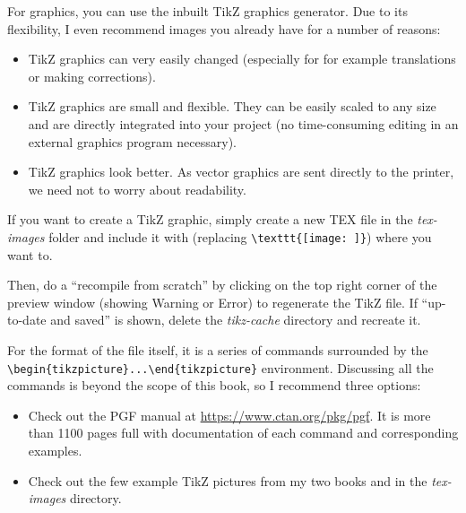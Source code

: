 For graphics, you can use the inbuilt TikZ graphics generator. Due to its
flexibility, I even recommend images you already have for a number of reasons:

\begin{itemize}
    \item TikZ graphics can very easily changed (especially for for example
    translations or making corrections).
    \item TikZ graphics are small and flexible. They can be easily scaled to any
    size and are directly integrated into your project (no time-consuming
    editing in an external graphics program necessary).
    \item TikZ graphics look better. As vector graphics are sent directly to the
    printer, we need not to worry about readability.
\end{itemize}

If you want to create a TikZ graphic, simply create a new TEX file in the
\textit{tex-images} folder and include it with \lstinline[language=Tex]!!
(replacing \lstinline[language=Tex]!\texttt{[image: ]}!) where you want to. 

Then, do a ``recompile from scratch'' by clicking on the top right corner of the
preview window (showing Warning or Error) to regenerate the TikZ file. If
``up-to-date and saved'' is shown, delete the \textit{tikz-cache} directory and
recreate it. 

For the format of the file itself, it is a series of commands surrounded by the
\lstinline[language=Tex]!\begin{tikzpicture}...\end{tikzpicture}! environment.
Discussing all the commands is beyond the scope of this book, so I recommend
three options:

\begin{itemize}
    \item Check out the PGF manual at \url{https://www.ctan.org/pkg/pgf}. It is
    more than 1100 pages full with documentation of each command and
    corresponding examples.
    \item Check out the few example TikZ pictures from my two books \cite{PFH1E}
    and \cite{PFH2E} in the \textit{tex-images} directory.
\end{itemize}